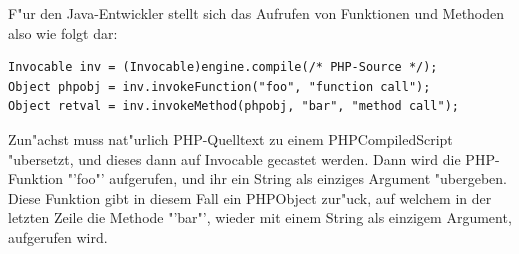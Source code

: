 F"ur den Java-Entwickler stellt sich das Aufrufen von Funktionen und Methoden also wie folgt dar:
\begin{lstlisting}[caption=Aufrufen von PHP-Funktionen und -Methoden]
Invocable inv = (Invocable)engine.compile(/* PHP-Source */);
Object phpobj = inv.invokeFunction("foo", "function call");
Object retval = inv.invokeMethod(phpobj, "bar", "method call");
\end{lstlisting}
Zun"achst muss nat"urlich PHP-Quelltext zu einem PHPCompiledScript "ubersetzt, und dieses dann auf Invocable gecastet werden. Dann wird die PHP-Funktion "'foo"'
aufgerufen, und ihr ein String als einziges Argument "ubergeben. Diese Funktion gibt in diesem Fall ein PHPObject zur"uck, auf welchem in der letzten Zeile
die Methode "'bar"', wieder mit einem String als einzigem Argument, aufgerufen wird.

